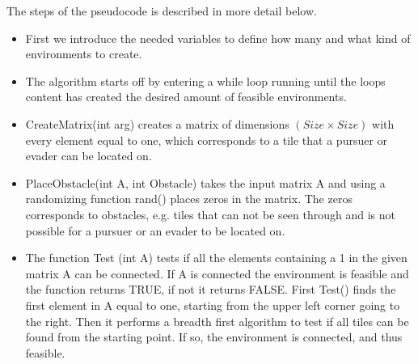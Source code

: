 The steps of the pseudocode is described in more detail below.
\begin{itemize}
\item First we introduce the needed variables to define how many and what kind of environments to create. 
\item The algorithm starts off by entering a while loop running until the loops content has created the desired amount of feasible environments. 
\item CreateMatrix(int arg) creates a matrix of dimensions $(Size \times Size)$ with every element equal to one, which corresponds to a tile that a pursuer or evader can be located on.
\item PlaceObstacle(int A, int Obstacle) takes the input matrix A and using a randomizing function rand() places zeros in the matrix. The zeros corresponds to obstacles, e.g. tiles that can not be seen through and is not possible for a pursuer or an evader to be located on.
\item The function Test (int A) tests if all the elements containing a 1 in the given matrix A can be connected. If A is connected the environment is feasible and the function returns TRUE, if not it returns FALSE. First Test() finds the first element in A equal to one, starting from the upper left corner going to the right. Then it performs a breadth first algorithm to test if all tiles can be found from the starting point. If so, the environment is connected, and thus feasible.
\end{itemize}
